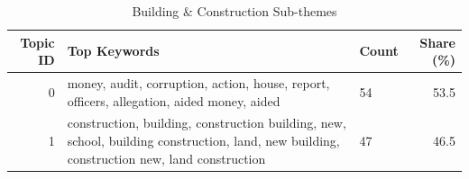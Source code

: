 \begin{table}[htbp]
\centering
\caption{Building \& Construction Sub-themes}
\label{tab:topics_Building_Construction}
\begin{tabular}{rlp{7cm}r}
\toprule
Topic ID & Top Keywords & Count & Share (\%) \\
\midrule
0 & money, audit, corruption, action, house, report, officers, allegation, aided money, aided & 54 & 53.5 \\
1 & construction, building, construction building, new, school, building construction, land, new building, construction new, land construction & 47 & 46.5 \\
\bottomrule
\end{tabular}
\end{table}